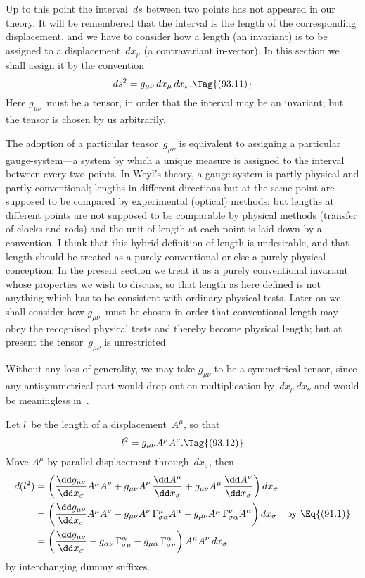 \documentclass[12pt]{book}
\begin{document}
%

Up to this point the interval~$ds$ between two points has not appeared in
our theory. It will be remembered that the interval is the length of the corresponding
displacement, and we have to consider how a length (an invariant)
is to be assigned to a displacement~$dx_{\mu}$ (a contravariant in\hyp{}vector). In this
section we shall assign it by the convention
\[
ds^{2} = g_{\mu\nu}\, dx_{\mu}\, dx_{\nu}.
\Tag{(93.11)}
\]
Here $g_{\mu\nu}$~must be a tensor, in order that the interval may be an invariant;
but the tensor is chosen by us arbitrarily.

The adoption of a particular tensor~$g_{\mu\nu}$ is equivalent to assigning a particular
gauge\hyp{}system---a system by which a unique measure is assigned to the interval
%
between every two points. In Weyl's theory, a gauge\hyp{}system is partly physical
and partly conventional; lengths in different directions but at the same point
are supposed to be compared by experimental (optical) methods; but lengths
at different points are not supposed to be comparable by physical methods
(transfer of clocks and rods) and the unit of length at each point is laid down
%
by a convention. I think that this hybrid definition of length is undesirable,
and that length should be treated as a purely conventional or else a purely
physical conception. In the present section we treat it as a purely conventional
invariant whose properties we wish to discuss, so that length as here
defined is not anything which has to be consistent with ordinary physical tests.
Later on we shall consider how $g_{\mu\nu}$~must be chosen in order that conventional
length may obey the recognised physical tests and thereby become physical
length; but at present the tensor~$g_{\mu\nu}$ is unrestricted.

Without any loss of generality, we may take $g_{\mu\nu}$ to be a symmetrical tensor,
since any antisymmetrical part would drop out on multiplication by~$dx_{\mu}\, dx_{\nu}$
and would be meaningless in~.

Let $l$~be the length of a displacement~$A^{\mu}$, so that
\[
l^{2} = g_{\mu\nu} A^{\mu} A^{\nu}.
\Tag{(93.12)}
\]
Move $A^{\mu}$ by parallel displacement through~$dx_{\sigma}$, then
\begin{align*}
  d(l^{2})
  &= \left(\frac{\dd g_{\mu\nu}}{\dd x_{\sigma}} A^{\mu} A^{\nu}
  + g_{\mu\nu} A^{\nu}\, \frac{\dd A^{\mu}}{\dd x_{\sigma}}
  + g_{\mu\nu} A^{\mu}\, \frac{\dd A^{\nu}}{\dd x_{\sigma}}\right) dx_{\sigma} \\
  &= \left(\frac{\dd g_{\mu\nu}}{\dd x_{\sigma}} A^{\mu} A^{\nu}
  - g_{\mu\nu} A^{\nu}\, \Gamma_{\sigma\alpha}^{\mu} A^{\alpha}
  - g_{\mu\nu} A^{\mu}\, \Gamma_{\sigma\alpha}^{\nu} A^{\alpha}\right) dx_{\sigma}
  \quad\text{by~\Eq{(91.1)}} \\
  &= \left(\frac{\dd g_{\mu\nu}}{\dd x_{\sigma}}
  - g_{\alpha\nu}\, \Gamma_{\sigma\mu}^{\alpha}
  - g_{\mu\alpha}\, \Gamma_{\sigma\nu}^{\alpha}\right) A^{\mu} A^{\nu}\, dx_{\sigma}
\end{align*}
by interchanging dummy suffixes.
\end{document}
